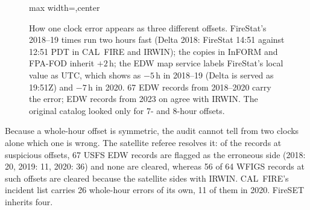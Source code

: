 \documentclass[11pt,a4paper]{article}
\newenvironment{fitfig}{\begin{adjustbox}{max width=\textwidth,center}}{\end{adjustbox}}
\begin{document}
\begin{figure}[h]
\begin{fitfig}
\end{fitfig}
\caption{How one clock error appears as three different offsets. FireStat's 2018--19 times run two hours fast
(Delta 2018: FireStat 14:51 against 12:51 PDT in CAL~FIRE and IRWIN); the copies in InFORM and FPA-FOD inherit
$+2$\,h; the EDW map service labels FireStat's local value as UTC, which shows as $-5$\,h in 2018--19 (Delta is
served as 19:51Z) and $-7$\,h in 2020. 67 EDW records from 2018--2020 carry the error; EDW records from 2023 on
agree with IRWIN. The original catalog looked only for 7- and 8-hour offsets.}
\label{fig:clock}
\end{figure}

Because a whole-hour offset is symmetric, the audit cannot tell from two clocks alone which one is wrong. The
satellite referee resolves it: of the records at suspicious offsets, 67 USFS EDW records are flagged as the
erroneous side (2018: 20, 2019: 11, 2020: 36) and none are cleared, whereas 56 of 64 WFIGS records at such
offsets are cleared because the satellite sides with IRWIN. CAL~FIRE's incident list carries 26 whole-hour
errors of its own, 11 of them in 2020. FireSET inherits four.
\end{document}
